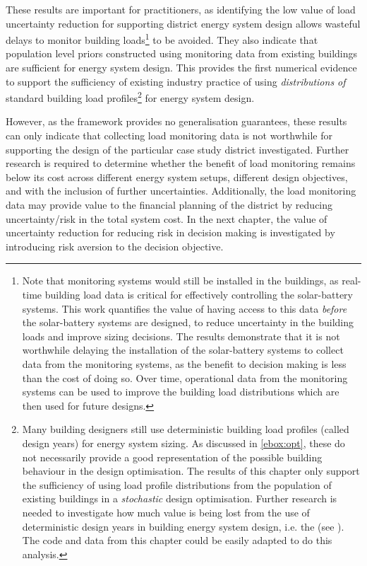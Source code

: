 These results are important for practitioners, as identifying the low value of load uncertainty reduction for supporting district energy system design allows wasteful delays to monitor building loads\footnote{Note that monitoring systems would still be installed in the buildings, as real-time building load data is critical for effectively controlling the solar-battery systems. This work quantifies the value of having access to this data \textit{before} the solar-battery systems are designed, to reduce uncertainty in the building loads and improve sizing decisions. The results demonstrate that it is not worthwhile delaying the installation of the solar-battery systems to collect data from the monitoring systems, as the benefit to decision making is less than the cost of doing so. Over time, operational data from the monitoring systems can be used to improve the building load distributions which are then used for future designs.} to be avoided. They also indicate that population level priors constructed using monitoring data from existing buildings are sufficient for energy system design. This provides the first numerical evidence to support the sufficiency of existing industry practice of using \textit{distributions of} standard building load profiles\footnote{Many building designers still use deterministic building load profiles (called design years) for energy system sizing. As discussed in \ref{ebox:opt}, these do not necessarily provide a good representation of the possible building behaviour in the design optimisation. The results of this chapter only support the sufficiency of using load profile distributions from the population of existing buildings in a \textit{stochastic} design optimisation. Further research is needed to investigate how much value is being lost from the use of deterministic design years in building energy system design, i.e. the  (see ). The code and data from this chapter could be easily adapted to do this analysis.} for energy system design.

However, as the  framework provides no generalisation guarantees, these results can only indicate that collecting load monitoring data is not worthwhile for supporting the design of the particular case study district investigated. Further research is required to determine whether the benefit of load monitoring remains below its cost across different energy system setups, different design objectives, and with the inclusion of further uncertainties.
Additionally, the load monitoring data may provide value to the financial planning of the district by reducing uncertainty/risk in the total system cost. In the next chapter, the value of uncertainty reduction for reducing risk in decision making is investigated by introducing risk aversion to the decision objective.



